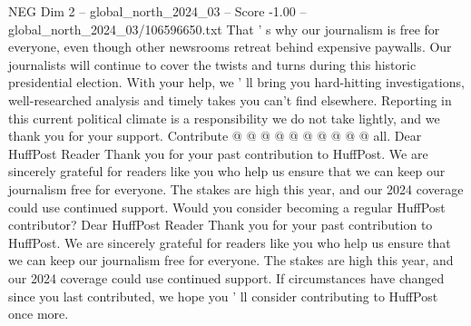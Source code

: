 \begin{textsample}{NEG Dim 2 – global\_north\_2024\_03 – Score -1.00 – global\_north\_2024\_03/106596650.txt}
That ' s why our journalism is free for everyone, even though other newsrooms retreat behind expensive paywalls.
Our journalists will continue to cover the twists and turns during this historic presidential election.
With your help, we ' ll bring you hard-hitting investigations, well-researched analysis and timely takes you can't find elsewhere.
Reporting in this current political climate is a responsibility we do not take lightly, and we thank you for your support.
Contribute @ @ @ @ @ @ @ @ @ @ all.
Dear HuffPost Reader Thank you for your past contribution to HuffPost.
We are sincerely grateful for readers like you who help us ensure that we can keep our journalism free for everyone.
The stakes are high this year, and our 2024 coverage could use continued support.
Would you consider becoming a regular HuffPost contributor?
Dear HuffPost Reader Thank you for your past contribution to HuffPost.
We are sincerely grateful for readers like you who help us ensure that we can keep our journalism free for everyone.
The stakes are high this year, and our 2024 coverage could use continued support.
If circumstances have changed since you last contributed, we hope you ' ll consider contributing to HuffPost once more.

\end{textsample}
